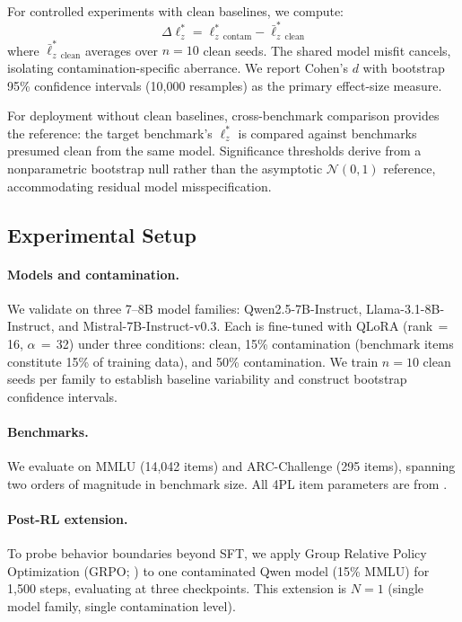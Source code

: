 For controlled experiments with clean baselines, we compute:
\begin{equation}
  \Delta\ell_z^* = \ell_z^*_{\text{contam}} - \bar{\ell}_z^{*}_{\text{clean}}
  \label{eq:delta_lz}
\end{equation}
where $\bar{\ell}_z^{*}_{\text{clean}}$ averages over $n{=}10$ clean seeds.
The shared model misfit cancels, isolating contamination-specific aberrance.
We report Cohen's $d$ with bootstrap 95\% confidence intervals (10,000 resamples) as the primary effect-size measure.

For deployment without clean baselines, cross-benchmark comparison provides the reference: the target benchmark's $\ell_z^*$ is compared against benchmarks presumed clean from the same model.
Significance thresholds derive from a nonparametric bootstrap null rather than the asymptotic $\mathcal{N}(0,1)$ reference, accommodating residual model misspecification.

\subsection{Experimental Setup}
\label{sec:setup}

\paragraph{Models and contamination.}
We validate on three 7--8B model families: Qwen2.5-7B-Instruct, Llama-3.1-8B-Instruct, and Mistral-7B-Instruct-v0.3.
Each is fine-tuned with QLoRA (rank\,$=$\,16, $\alpha$\,$=$\,32) under three conditions: clean, 15\% contamination (benchmark items constitute 15\% of training data), and 50\% contamination.
We train $n{=}10$ clean seeds per family to establish baseline variability and construct bootstrap confidence intervals.

\paragraph{Benchmarks.}
We evaluate on MMLU \citep{hendrycks2021mmlu} (14,042 items) and ARC-Challenge \citep{clark2018arc} (295 items), spanning two orders of magnitude in benchmark size.
All 4PL item parameters are from \citet{psnirt2026}.

\paragraph{Post-RL extension.}
To probe behavior boundaries beyond SFT, we apply Group Relative Policy Optimization (GRPO; \citealp{shao2024}) to one contaminated Qwen model (15\% MMLU) for 1,500 steps, evaluating at three checkpoints.
This extension is $N{=}1$ (single model family, single contamination level).
